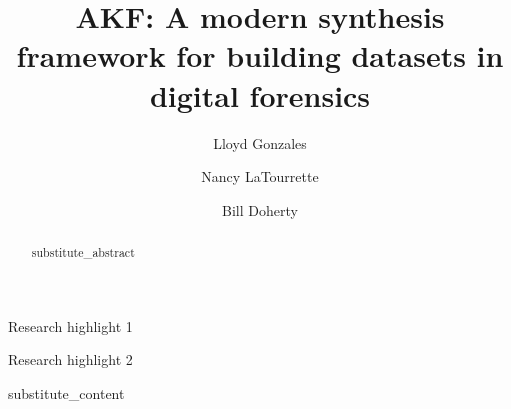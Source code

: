 \documentclass[final,3p,times,twocolumn]{elsarticle}
\begin{document}
\begin{frontmatter}

\title{AKF: A modern synthesis framework for building datasets in digital forensics}

\author[unr]{Lloyd Gonzales}
\author[unr]{Nancy LaTourrette}
\author[unr]{Bill Doherty}

\begin{abstract}
{{substitute_abstract}}
\end{abstract}


\begin{highlights}
\item Research highlight 1
\item Research highlight 2
\end{highlights}
    

\begin{keyword}



\end{keyword}

\end{frontmatter}

{{substitute_content}}

\appendix

 

\end{document}
